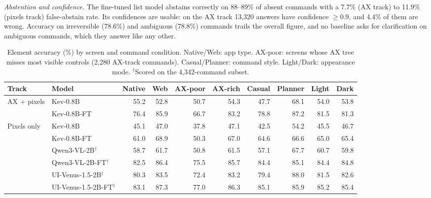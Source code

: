 \documentclass[a4paper,twoside]{article}
\begin{document}
\emph{Abstention and confidence.} The fine-tuned list model abstains correctly on 88--89\% of absent commands with a 7.7\% (AX track) to 11.9\% (pixels track) false-abstain rate. Its confidences are usable: on the AX track 13,320 answers have confidence $\geq 0.9$, and 4.4\% of them are wrong. Accuracy on irreversible (78.6\%) and ambiguous (78.8\%) commands trails the overall figure, and no baseline asks for clarification on ambiguous commands, which they answer like any other.

\begin{table}[t]
\centering
\caption{Element accuracy (\%) by screen and command condition. Native/Web: app type. AX-poor: screens whose AX tree misses most visible controls (2,280 AX-track commands). Casual/Planner: command style. Light/Dark: appearance mode. $^\dagger$Scored on the 4,342-command subset.}
\label{tab:breakdown}
\small
\setlength{\tabcolsep}{4pt}
\begin{tabular}{@{}llrrrrrrrr@{}}
\toprule
Track & Model & Native & Web & AX-poor & AX-rich & Casual & Planner & Light & Dark \\
\midrule
AX + pixels & Kev-0.8B & 55.2 & 52.8 & 50.7 & 54.3 & 47.7 & 68.1 & 54.0 & 53.8 \\
            & Kev-0.8B-FT & 76.4 & 85.9 & 66.7 & 83.2 & 78.8 & 87.2 & 81.5 & 81.3 \\
\midrule
Pixels only & Kev-0.8B & 45.1 & 47.0 & 37.8 & 47.1 & 42.5 & 54.2 & 45.5 & 46.7 \\
            & Kev-0.8B-FT & 61.0 & 68.9 & 50.3 & 67.0 & 64.6 & 66.6 & 65.0 & 65.4 \\
            & Qwen3-VL-2B$^\dagger$ & 58.7 & 61.7 & 50.8 & 61.5 & 57.1 & 67.7 & 60.7 & 59.8 \\
            & Qwen3-VL-2B-FT$^\dagger$ & 82.5 & 86.4 & 75.5 & 85.7 & 84.4 & 85.1 & 84.4 & 84.8 \\
            & UI-Venus-1.5-2B$^\dagger$ & 80.3 & 83.5 & 72.4 & 83.2 & 79.4 & 88.0 & 81.5 & 82.6 \\
            & UI-Venus-1.5-2B-FT$^\dagger$ & 83.1 & 87.3 & 77.0 & 86.3 & 85.1 & 85.9 & 85.2 & 85.4 \\
\bottomrule
\end{tabular}
\end{table}
\end{document}
